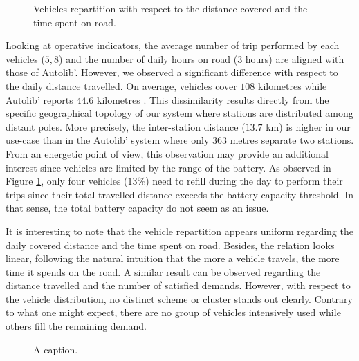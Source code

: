 \begin{bibunit}[ieeetr]
\begin{figure}[t]
\centering

\caption{Vehicles repartition with respect to the distance covered and the time spent on road.}
\label{fig:VehicleDistVsNbTSTraveling}
\end{figure}
\medskip
Looking at operative indicators, the average number of trip performed by each vehicles ($5,8$) and the number of daily hours on road ($3$ hours) are aligned with those of Autolib'.
However, we observed a significant difference with respect to the daily distance travelled.
On average, vehicles cover $108$ kilometres while Autolib' reports $44.6$ kilometres \cite{autolib_rapport_2014}.
This dissimilarity results directly from the specific geographical topology of our system where stations are distributed among distant poles.
More precisely, the inter-station distance ($13.7$ km) is higher in our use-case than in the Autolib' system where only $363$ metres separate two stations.
From an energetic point of view, this observation may provide an additional interest since vehicles are limited by the range of the battery.
As observed in Figure \ref{fig:VehicleDistVsNbTSTraveling}, only four vehicles ($13$\%) need to refill during the day to perform their trips since their total travelled distance exceeds the battery capacity threshold.
In that sense, the total battery capacity do not seem as an issue.

It is interesting to note that the vehicle repartition appears uniform regarding the daily covered distance and the time spent on road.
Besides, the relation looks linear, following the natural intuition that the more a vehicle travels, the more time it spends on the road.
A similar result can be observed regarding the distance travelled and the number of satisfied demands.
However, with respect to the vehicle distribution, no distinct scheme or cluster stands out clearly.
Contrary to what one might expect, there are no group of vehicles intensively used while others fill the remaining demand.


\begin{figure}[t]
\centering

\caption{A caption.}
\label{fig:MaxEnergyUsedVsNbTSTraveling}
\end{figure}


\end{bibunit}
